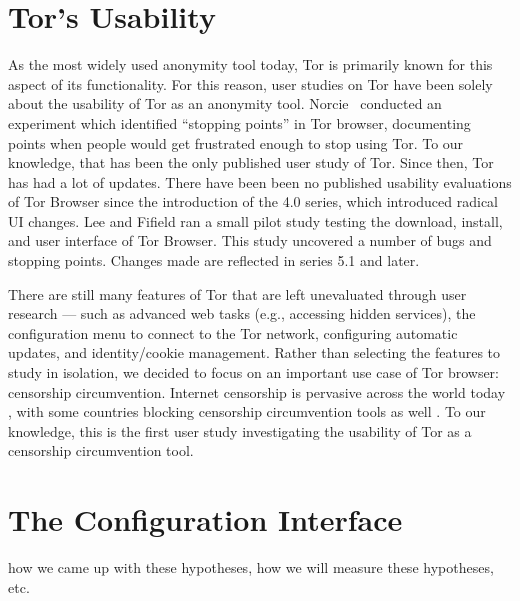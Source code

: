 \documentclass{template}
\begin{document}
\section{Tor's Usability}
As the most widely used anonymity tool today, Tor is primarily known for this aspect of its functionality.
For this reason, user studies on Tor have been solely about the usability of Tor as an
anonymity tool. Norcie~\cite{norcie2012eliminating} conducted an experiment which identified 
``stopping points'' in Tor browser,  documenting points when people would get frustrated enough 
to stop using Tor. To our knowledge, that has been the only published user study of Tor. 
Since then, Tor has had a lot of updates. There have been been no published usability evaluations of
Tor Browser since the introduction of the 4.0 series, which introduced radical UI changes. 
Lee and Fifield \cite {uxsprint} ran a small pilot study testing the download, install, and user interface of Tor Browser. 
This study uncovered a number of bugs and stopping points. Changes made are reflected in series 
5.1 and later. 

There are still many features of Tor that are left unevaluated through user
research --- such as advanced web tasks (e.g., accessing hidden services), the
configuration menu to connect to the Tor network, configuring automatic
updates, and identity/cookie management. Rather than selecting the features to
study in isolation,
we decided to focus on an important use case of Tor browser: censorship circumvention. 
Internet censorship is pervasive across the world today \cite{faris2008measuring}, with 
some countries blocking censorship circumvention tools as well \cite{winter2012great}. 
To our knowledge, this is the first user study investigating the usability of Tor as a 
censorship circumvention tool.

\section{The Configuration Interface}

 {\color {red} how we came up with these hypotheses, how we will measure these hypotheses, etc.} 
\end{document}
